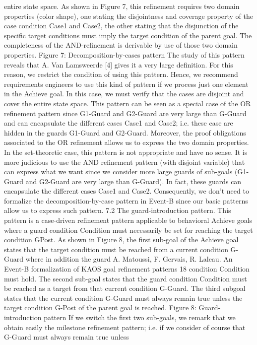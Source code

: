 entire state space. As shown in Figure 7, this refinement requires two domain properties
(color shape), one stating the disjointness and coverage property of the case condition Case1
and Case2, the other stating that the disjunction of the specific target conditions must imply
the target condition of the parent goal. The completeness of the AND-refinement is derivable
by use of those two domain properties.
Figure 7: Decomposition-by-cases pattern
The study of this pattern reveals that A. Van Lamsweerde [4] gives it a very large definition. For this reason, we restrict the condition of using this pattern. Hence, we recommend
requirements engineers to use this kind of pattern if we process just one element in the Achieve
goal. In this case, we must verify that the cases are disjoint and cover the entire state space.
This pattern can be seen as a special case of the OR refinement pattern since G1-Guard
and G2-Guard are very large than G-Guard and can encapsulate the different cases Case1
and Case2; i.e. these case are hidden in the guards G1-Guard and G2-Guard. Moreover,
the proof obligations associated to the OR refinement allows us to express the two domain
properties.
In the set-theoretic case, this pattern is not appropriate and have no sense. It is more
judicious to use the AND refinement pattern (with disjoint variable) that can express what
we want since we consider more large guards of sub-goals (G1-Guard and G2-Guard are very
large than G-Guard). In fact, these guards can encapsulate the different cases Case1 and
Case2.
Consequently, we don’t need to formalize the decomposition-by-case pattern in Event-B
since our basic patterns allow us to express such pattern.
7.2 The guard-introduction pattern.
This pattern is a case-driven refinement pattern applicable to behavioral Achieve goals where
a guard condition Condition must necessarily be set for reaching the target condition GPost. As shown in Figure 8, the first sub-goal of the Achieve goal states that the target
condition must be reached from a current condition G-Guard where in addition the guard
A. Matoussi, F. Gervais, R. Laleau. An Event-B formalization of KAOS goal refinement patterns 18
condition Condition must hold. The second sub-goal states that the guard condition Condition must be reached as a target from that current condition G-Guard. The third subgoal states that the current condition G-Guard must always remain true unless the target
condition G-Post of the parent goal is reached.
Figure 8: Guard-introduction pattern
If we switch the first two sub-goals, we remark that we obtain easily the milestone refinement pattern; i.e. if we consider of course that G-Guard must always remain true unless
